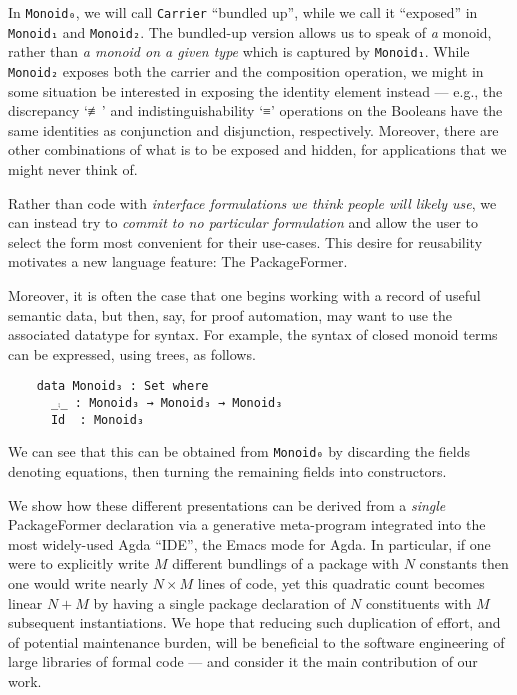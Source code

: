 \documentclass[sigplan,screen]{acmart}
\begin{document}
\vspace{0.3em}\noindent
In \texttt{Monoid₀}, we will call \texttt{Carrier} “bundled up”,
while we call it “exposed” in \texttt{Monoid₁} and \texttt{Monoid₂}.
The bundled-up version allows us to speak of \emph{a}
monoid, rather than \emph{a monoid on a given type} which is captured by \texttt{Monoid₁}.
While \texttt{Monoid₂} exposes both the carrier and the composition operation,
we might in some situation be interested
in exposing the identity element instead
--- e.g., the discrepancy ‘≢’ and indistinguishability ‘≡’ operations
on the Booleans
have the same identities as conjunction and disjunction, respectively.
Moreover, there are other combinations of what is to be exposed and hidden,
for applications that we might never think of.

Rather than code with \emph{interface formulations we think people will likely use}, we can
instead try to \emph{commit to no particular formulation} and allow the user to select
the form most convenient for their use-cases. This desire for reusability motivates
a new language feature: The \textsf{\upshape PackageFormer}.

Moreover, it is often the case that one begins working with a record of useful
semantic data, but then, say, for proof automation, may want to use the associated
datatype for syntax. For example, the syntax of closed monoid terms can be expressed,
using trees, as follows.
\begin{verbatim}
    data Monoid₃ : Set where
      _⨾_ : Monoid₃ → Monoid₃ → Monoid₃
      Id  : Monoid₃
\end{verbatim}
\noindent
We can see that this can be
obtained from \texttt{Monoid₀} by discarding the
fields denoting equations, then turning the remaining fields into constructors.

We show how these different
presentations can be derived from a \emph{single}
\textsf{\upshape PackageFormer} declaration
via a generative meta-program integrated into the
most widely-used Agda “IDE”, the Emacs mode for Agda.
In particular,
if one were to explicitly write \(M\) different bundlings of a package
with \(N\) constants then one would write nearly \(N × M\) lines of code,
yet this quadratic count becomes linear \(N + M\) by having a single
package declaration of \(N\) constituents with \(M\) subsequent instantiations.
We hope that reducing such duplication of effort, and of potential maintenance
burden, will be beneficial to the software engineering of large libraries
of formal code --- and consider it the main contribution of our work.
\end{document}
